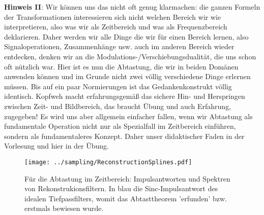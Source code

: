 \textbf{Hinweis II}: Wir können uns das nicht oft genug klarmachen: die ganzen
Formeln der Transformationen interessieren sich nicht welchen Bereich wir wie
interpretieren,
also was wir als Zeitbereich und was als Frequenzbereich deklarieren. Daher werden
wir alle Dinge die wir für einen Bereich lernen, also Signaloperationen, Zusammenhänge usw.
auch im anderen Bereich wieder entdecken, denken wir an die Modulations-/Verschiebungsdualität,
die uns schon oft nützlich war.
Hier ist es nun die Abtastung, die wir in beiden Domänen anwenden können und
im Grunde nicht zwei völlig verschiedene Dinge erlernen müssen. Bis auf ein
paar Normierungen ist das Gedankenkonstrukt völlig identisch. Kopfweh macht
erfahrungsgemäß das sichere Hin- und Herspringen zwischen Zeit- und Bildbereich,
das braucht Übung und auch Erfahrung, zugegeben! Es wird uns aber allgemein
einfacher fallen, wenn wir Abtastung als fundamentale Operation
nicht nur als Spezialfall im Zeitbereich einführen, sondern als fundamentaleres
Konzept. Daher unser didaktischer Faden in der Vorlesung und hier in der
Übung.



\begin{figure}
\texttt{[image: ../sampling/ReconstructionSplines.pdf]}
  \caption{Für die Abtastung im Zeitbereich: Impulsantworten und Spektren von
  Rekonstrukionsfiltern. In blau die Sinc-Impulsantwort des idealen Tiefpassfilters,
  womit das Abtasttheorem 'erfunden' bzw. erstmals bewiesen wurde.}
  \label{fig:ReconstructionSplines}
\end{figure}



\clearpage
